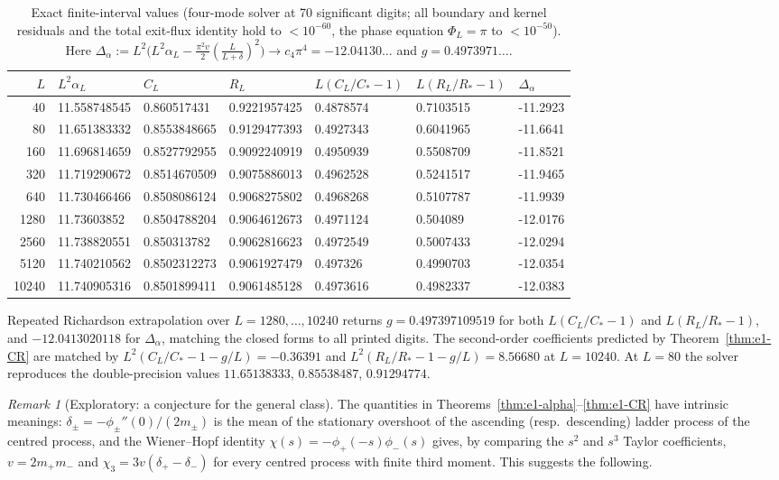 \documentclass[11pt,a4paper]{article}
\theoremstyle{definition}
\theoremstyle{remark}
\newtheorem{remark}[theorem]{Remark}
\newcommand{\1}{\mathbf 1}
\begin{document}
\begin{table}[ht]
\centering
\scriptsize
\caption{Exact finite-interval values (four-mode solver at 70 significant digits;
all boundary and kernel residuals and the total exit-flux identity hold to $<10^{-60}$,
the phase equation $\Phi_L=\pi$ to $<10^{-50}$). Here
$\Delta_\alpha:=L^2\bigl(L^2\alpha_L-\frac{\pi^2v}2(\frac L{L+\delta})^2\bigr)\to c_4\pi^4=-12.04130\ldots$
and $g=0.4973971\ldots$.}
\label{tab:e1}
\setlength{\tabcolsep}{3pt}
\begin{tabular}{rllllll}
\toprule
$L$ & $L^2\alpha_L$ & $C_L$ & $R_L$ & $L(C_L/C_*-1)$ & $L(R_L/R_*-1)$ & $\Delta_\alpha$\\
\midrule
40 & 11.558748545 & 0.860517431 & 0.9221957425 & 0.4878574 & 0.7103515 & -11.2923 \\
80 & 11.651383332 & 0.8553848665 & 0.9129477393 & 0.4927343 & 0.6041965 & -11.6641 \\
160 & 11.696814659 & 0.8527792955 & 0.9092240919 & 0.4950939 & 0.5508709 & -11.8521 \\
320 & 11.719290672 & 0.8514670509 & 0.9075886013 & 0.4962528 & 0.5241517 & -11.9465 \\
640 & 11.730466466 & 0.8508086124 & 0.9068275802 & 0.4968268 & 0.5107787 & -11.9939 \\
1280 & 11.73603852 & 0.8504788204 & 0.9064612673 & 0.4971124 & 0.504089 & -12.0176 \\
2560 & 11.738820551 & 0.850313782 & 0.9062816623 & 0.4972549 & 0.5007433 & -12.0294 \\
5120 & 11.740210562 & 0.8502312273 & 0.9061927479 & 0.497326 & 0.4990703 & -12.0354 \\
10240 & 11.740905316 & 0.8501899411 & 0.9061485128 & 0.4973616 & 0.4982337 & -12.0383 \\
\bottomrule
\end{tabular}
\end{table}

Repeated Richardson extrapolation over $L=1280,\dots,10240$ returns
$g=0.497397109519$ for both $L(C_L/C_*-1)$ and $L(R_L/R_*-1)$, and
$-12.0413020118$ for $\Delta_\alpha$, matching the closed forms to all printed digits.
The second-order coefficients predicted by Theorem~\ref{thm:e1-CR} are matched by
$L^2(C_L/C_*-1-g/L)=-0.36391$ and $L^2(R_L/R_*-1-g/L)=8.56680$ at $L=10240$. At $L=80$
the solver reproduces the double-precision values $11.65138333$, $0.85538487$, $0.91294774$.

\begin{remark}[Exploratory: a conjecture for the general class]
The quantities in Theorems~\ref{thm:e1-alpha}--\ref{thm:e1-CR} have intrinsic
meanings: $\delta_\pm=-\phi_\pm''(0)/(2m_\pm)$ is the mean of the stationary overshoot of
the ascending (resp.\ descending) ladder process of the centred process, and the
Wiener--Hopf identity $\chi(s)=-\phi_+(-s)\phi_-(s)$ gives, by comparing the $s^2$ and
$s^3$ Taylor coefficients, $v=2m_+m_-$ and $\chi_3=3v(\delta_+-\delta_-)$ for every
centred process with finite third moment. This suggests the following.

\end{remark}
\end{document}
